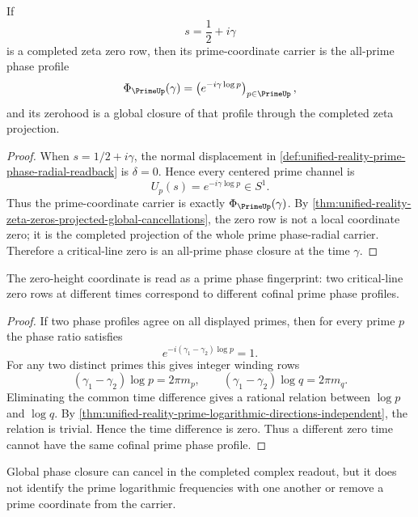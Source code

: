 \begin{theorem}
\label{thm:unified-reality-critical-line-zeros-all-prime-phase-closures}
If
$$
s=\frac12+i\gamma
$$
is a completed zeta zero row, then its prime-coordinate carrier is the
all-prime phase profile
$$
\Phi_{\PrimeUp}(\gamma)
=
\left(e^{-i\gamma\log p}\right)_{p\in\PrimeUp},
$$
and its zerohood is a global closure of that profile through the
completed zeta projection.
\end{theorem}

\begin{proof}
When $s=1/2+i\gamma$, the normal displacement in
\autoref{def:unified-reality-prime-phase-radial-readback} is
$\delta=0$.  Hence every centered prime channel is
$$
U_p(s)=e^{-i\gamma\log p}\in S^1.
$$
Thus the prime-coordinate carrier is exactly
$\Phi_{\PrimeUp}(\gamma)$.  By
\autoref{thm:unified-reality-zeta-zeros-projected-global-cancellations},
the zero row is not a local coordinate zero; it is the completed
projection of the whole prime phase-radial carrier.  Therefore a
critical-line zero is an all-prime phase closure at the time $\gamma$.
\end{proof}

\begin{corollary}
\label{cor:unified-reality-different-zero-times-phase-fingerprints}
The zero-height coordinate is read as a prime phase fingerprint: two
critical-line zero rows at different times correspond to different
cofinal prime phase profiles.
\end{corollary}

\begin{proof}
If two phase profiles agree on all displayed primes, then for every
prime $p$ the phase ratio satisfies
$$
e^{-i(\gamma_1-\gamma_2)\log p}=1.
$$
For any two distinct primes this gives integer winding rows
$$
(\gamma_1-\gamma_2)\log p=2\pi m_p,
\qquad
(\gamma_1-\gamma_2)\log q=2\pi m_q.
$$
Eliminating the common time difference gives a rational relation between
$\log p$ and $\log q$.  By
\autoref{thm:unified-reality-prime-logarithmic-directions-independent},
the relation is trivial.  Hence the time difference is zero.  Thus a
different zero time cannot have the same cofinal prime phase profile.
\end{proof}

\begin{corollary}
\label{cor:unified-reality-prime-frequencies-do-not-cancel-as-coordinates}
Global phase closure can cancel in the completed complex readout, but it
does not identify the prime logarithmic frequencies with one another or
remove a prime coordinate from the carrier.
\end{corollary}

